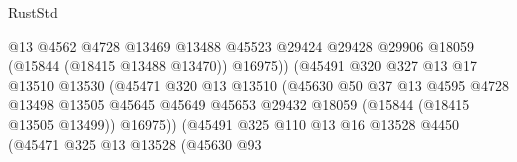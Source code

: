\begin{lexlean}{RustStd}
\begin{coremodule}
                                            @13
                                            @4562
                                            @4728
                                            @13469
                                            @13488
                                            @45523
                                            @29424
                                            @29428
                                            @29906
                                            @18059
                                            (@15844 (@18415 @13488 @13470))
                                            @16975))
                                        (@45491
                                          @320
                                          @327
                                          @13
                                          @17
                                          @13510
                                          @13530
                                          (@45471
                                            @320
                                            @13
                                            @13510
                                            (@45630
                                              @50
                                              @37
                                              @13
                                              @4595
                                              @4728
                                              @13498
                                              @13505
                                              @45645
                                              @45649
                                              @45653
                                              @29432
                                              @18059
                                              (@15844 (@18415 @13505 @13499))
                                              @16975))
                                          (@45491
                                            @325
                                            @110
                                            @13
                                            @16
                                            @13528
                                            @4450
                                            (@45471
                                              @325
                                              @13
                                              @13528
                                              (@45630
                                                @93

\end{coremodule}
\end{lexlean}

